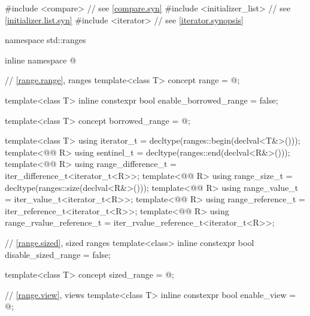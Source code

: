 %
%
\begin{codeblock}
#include <compare>              // see \ref{compare.syn}
#include <initializer_list>     // see \ref{initializer.list.syn}
#include <iterator>             // see \ref{iterator.synopsis}

namespace std::ranges {
  inline namespace @

  // \ref{range.range}, ranges
  template<class T>
    concept range = @\seebelow@;

  template<class T>
    inline constexpr bool enable_borrowed_range = false;

  template<class T>
    concept borrowed_range = @\seebelow@;

  template<class T>
    using iterator_t = decltype(ranges::begin(declval<T&>()));
  template<@@ R>
    using sentinel_t = decltype(ranges::end(declval<R&>()));
  template<@@ R>
    using range_difference_t = iter_difference_t<iterator_t<R>>;
  template<@@ R>
    using range_size_t = decltype(ranges::size(declval<R&>()));
  template<@@ R>
    using range_value_t = iter_value_t<iterator_t<R>>;
  template<@@ R>
    using range_reference_t = iter_reference_t<iterator_t<R>>;
  template<@@ R>
    using range_rvalue_reference_t = iter_rvalue_reference_t<iterator_t<R>>;

  // \ref{range.sized}, sized ranges
  template<class>
    inline constexpr bool disable_sized_range = false;

  template<class T>
    concept sized_range = @\seebelow@;

  // \ref{range.view}, views
  template<class T>
    inline constexpr bool enable_view = @\seebelow@;

}
\end{codeblock}
